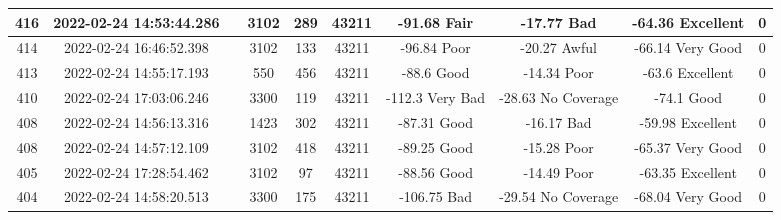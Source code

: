 \begin{longtable*}{|c|c|c|c|c|c|c|c|c|c|}
416&2022-02-24 14:53:44.286&&3102&289&43211& -91.68    Fair        & -17.77    Bad         & -64.36    Excellent   & 0\\\hline
{}414&2022-02-24 16:46:52.398&&3102&133&43211& -96.84    Poor        & -20.27    Awful       & -66.14    Very Good   & 0\\\hline
{}413&2022-02-24 14:55:17.193&&550&456&43211& -88.6     Good        & -14.34    Poor        & -63.6     Excellent   & 0\\\hline
{}410&2022-02-24 17:03:06.246&&3300&119&43211& -112.3    Very Bad    & -28.63    No Coverage & -74.1     Good        & 0\\\hline
{}408&2022-02-24 14:56:13.316&&1423&302&43211& -87.31    Good        & -16.17    Bad         & -59.98    Excellent   & 0\\\hline
{}408&2022-02-24 14:57:12.109&&3102&418&43211& -89.25    Good        & -15.28    Poor        & -65.37    Very Good   & 0\\\hline
{}405&2022-02-24 17:28:54.462&&3102&97&43211& -88.56    Good        & -14.49    Poor        & -63.35    Excellent   & 0\\\hline
{}404&2022-02-24 14:58:20.513&&3300&175&43211& -106.75   Bad         & -29.54    No Coverage & -68.04    Very Good   & 0\\\hline

\end{longtable*}
